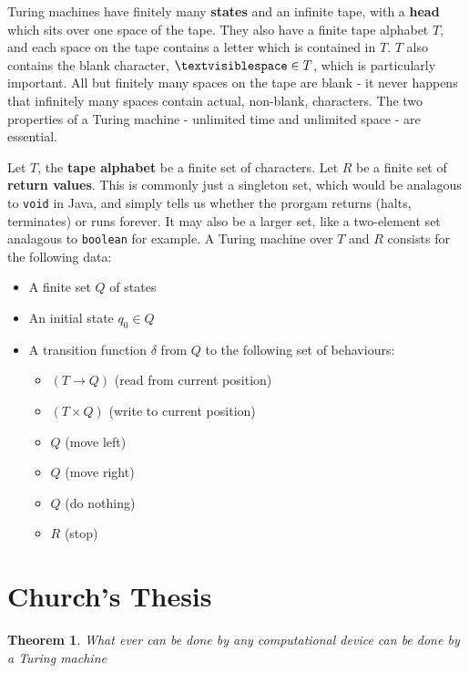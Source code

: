 \documentclass[11pt]{article}
\newtheorem{theorem}{Theorem}
\begin{document}
	\par 
	Turing machines have finitely many \textbf{states} and an infinite tape, with a \textbf{head} which sits over one space of the tape. They also have a finite tape alphabet $T$, and each space on the tape contains a letter which is contained in $T$. $T$ also contains the blank character, $\textvisiblespace \in T$, which is particularly important. All but finitely many spaces on the tape are blank - it never happens that infinitely many spaces contain actual, non-blank, characters. The two properties of a Turing machine - unlimited time and unlimited space - are essential.
	
	\par 
	Let $T$, the \textbf{tape alphabet} be a finite set of characters. Let $R$ be a finite set of \textbf{return values}. This is commonly just a singleton set, which would be analagous to \texttt{void} in Java, and simply tells us whether the prorgam returns (halts, terminates) or runs forever. It may also be a larger set, like a two-element set analagous to \texttt{boolean} for example. A Turing machine over $T$ and $R$ consists for the following data:
	\begin{itemize}
		\item A finite set $Q$ of states
		\item An initial state $q_{0} \in Q$
		\item A transition function $\delta$ from $Q$ to the following set of behaviours:
			\begin{itemize}
				\item $(T \rightarrow Q)$ (read from current position)
				\item $(T \times Q)$ (write to current position)
				\item $Q$ (move left)
				\item $Q$ (move right)
				\item $Q$ (do nothing)
				\item $R$ (stop)
			\end{itemize}
	\end{itemize}
	
	\section{Church's Thesis}
	\begin{theorem} 
		What ever can be done by any computational device can be done by a Turing machine
	\end{theorem}
	
\end{document}
